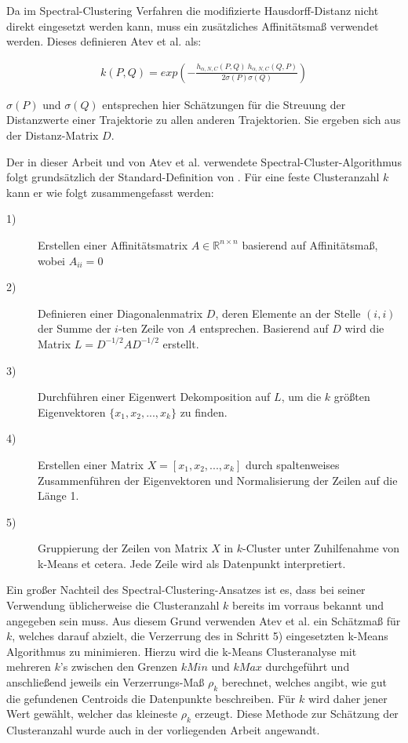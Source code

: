 Da im Spectral-Clustering Verfahren die modifizierte Hausdorff-Distanz nicht direkt eingesetzt werden kann,
muss ein zusätzliches Affinitätsmaß verwendet werden. %
Dieses definieren Atev et al. als:

\begin{ceqn}
\begin{align}
    k(P,Q) = exp (- \frac{h_{\alpha, N, C}(P,Q)\ h_{\alpha, N, C}(Q,P)}{2 \sigma(P) \sigma(Q)})
\end{align}
\end{ceqn}

$\sigma(P)$ und $\sigma(Q)$ entsprechen hier Schätzungen für die Streuung der Distanzwerte einer Trajektorie
zu allen anderen Trajektorien. Sie ergeben sich aus der Distanz-Matrix $D$.

Der in dieser Arbeit und von Atev et al. verwendete Spectral-Cluster-Algorithmus folgt grundsätzlich
der Standard-Definition von \cite[]{Ng2002}.
Für eine feste Clusteranzahl $k$ kann er wie folgt zusammengefasst werden:

\begin{description}
    \item[1)] Erstellen einer Affinitätsmatrix $A \in \mathbb{R}^{n \times n}$ basierend auf Affinitätsmaß, wobei $A_{ii} = 0$
    \item[2)] Definieren einer Diagonalenmatrix $D$, deren Elemente an der Stelle $(i,i)$ der Summe der $i$-ten
            Zeile von $A$ entsprechen. Basierend auf $D$ wird die Matrix $L = D^{-1/2} AD^{-1/2}$ erstellt.
    \item[3)] Durchführen einer Eigenwert Dekomposition auf $L$, um die $k$ größten Eigenvektoren
            $\{x_1, x_2, ..., x_k\}$ zu finden.
    \item[4)] Erstellen einer Matrix $X = [x_1, x_2,..., x_k]$ durch spaltenweises Zusammenführen der Eigenvektoren und
            Normalisierung der Zeilen auf die Länge 1.
    \item[5)] Gruppierung der Zeilen von Matrix $X$ in $k$-Cluster unter Zuhilfenahme von k-Means et cetera.
            Jede Zeile wird als Datenpunkt interpretiert.
\end{description}

Ein großer Nachteil des Spectral-Clustering-Ansatzes ist es, dass bei seiner Verwendung üblicherweise die Clusteranzahl $k$
bereits im vorraus bekannt und angegeben sein muss. Aus diesem Grund verwenden Atev et al. ein Schätzmaß für
$k$, welches darauf abzielt, die Verzerrung des in Schritt 5) eingesetzten k-Means Algorithmus zu minimieren.
Hierzu wird die k-Means Clusteranalyse mit mehreren $k$'s zwischen den Grenzen $kMin$ und $kMax$ durchgeführt
und anschließend jeweils ein Verzerrungs-Maß $\rho_k$ berechnet, welches angibt, wie gut die gefundenen Centroids
die Datenpunkte beschreiben. Für $k$ wird daher jener Wert gewählt, welcher das
kleineste $\rho_k$ erzeugt. Diese Methode zur Schätzung der Clusteranzahl wurde auch in der vorliegenden
Arbeit angewandt.


